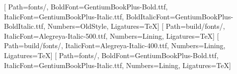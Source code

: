 \usepackage{fontspec}
\usepackage{xcolor}

\setmainfont{GentiumBookPlus-Regular.ttf}[
  Path=fonts/, BoldFont=GentiumBookPlus-Bold.ttf, ItalicFont=GentiumBookPlus-Italic.ttf,
  BoldItalicFont=GentiumBookPlus-BoldItalic.ttf, Numbers=OldStyle, Ligatures=TeX]
\newfontfamily{}[
  Path=build/fonts/, ItalicFont=Alegreya-Italic-500.ttf, Numbers=Lining, Ligatures=TeX]
\newfontfamily{}[
  Path=build/fonts/, ItalicFont=Alegreya-Italic-400.ttf, Numbers=Lining, Ligatures=TeX]
\newfontfamily{}[
  Path=fonts/, BoldFont=GentiumBookPlus-Bold.ttf, ItalicFont=GentiumBookPlus-Italic.ttf, Numbers=Lining, Ligatures=TeX]

\color{ink}
\usepackage{microtype}
\frenchspacing
\setlength{\parindent}{1.1em}
\setlength{\parskip}{0pt}
\linespread{1.12}

\usepackage{titlesec}
\titleformat{\section}{\heading\Large\color{ink}\raggedright}{\color{ochretext}\thesection}{0.6em}{}
\titleformat{\subsection}{\heading\large\color{ink}\raggedright}{\color{ochretext}\thesubsection}{0.6em}{}

\usepackage{caption}
\captionsetup[table]{position=top}

